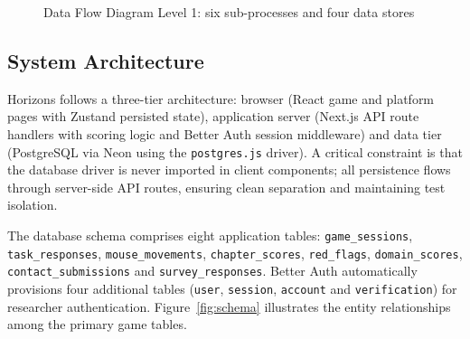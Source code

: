 \documentclass[12pt,a4paper,oneside]{report}
\begin{document}
\begin{figure}[b]
{}
		\caption{Data Flow Diagram Level 1: six sub-processes and four data stores}
		\label{fig:dfd1}
	\end{figure}
	
	\clearpage
	\subsection{System Architecture}
	
	Horizons follows a three-tier architecture: browser (React game and platform pages with Zustand persisted state), application server (Next.js API route handlers with scoring logic and Better Auth session middleware) and data tier (PostgreSQL via Neon using the \texttt{postgres.js} driver). A critical constraint is that the database driver is never imported in client components; all persistence flows through server-side API routes, ensuring clean separation and maintaining test isolation.
	
	\begin{sloppypar}
		The database schema comprises eight application tables:
		\texttt{game\_sessions}, \texttt{task\_responses}, \texttt{mouse\_movements},
		\texttt{chapter\_scores}, \texttt{red\_flags}, \texttt{domain\_scores},
		\texttt{contact\_submissions} and \texttt{survey\_responses}.
		Better Auth automatically provisions four additional tables (\texttt{user}, \texttt{session}, \texttt{account} and \texttt{verification}) for researcher authentication.
		Figure~\ref{fig:schema} illustrates the entity relationships among the primary game tables.
	\end{sloppypar}
	
\end{document}
